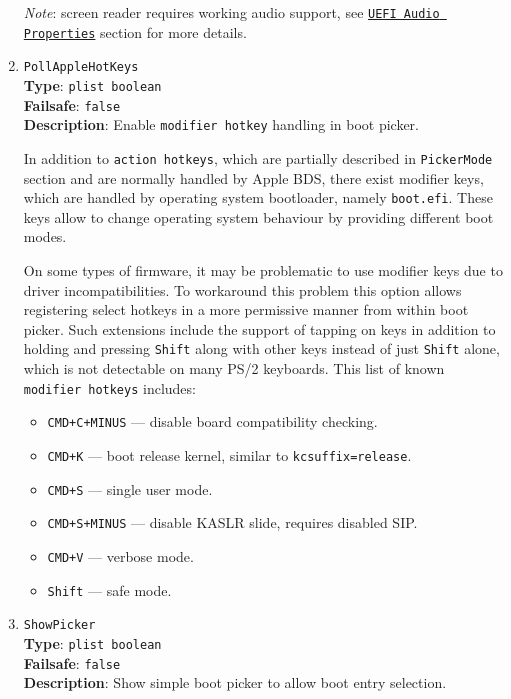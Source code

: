 \documentclass[]{article}
\providecommand{\tightlist}{%
  \setlength{\itemsep}{0pt}\setlength{\parskip}{0pt}}
\begin{document}
\begin{enumerate}
  \emph{Note}: screen reader requires working audio support, see
  \hyperref[uefiaudioprops]{\texttt{UEFI Audio Properties}}
  section for more details.

\item
  \texttt{PollAppleHotKeys}\\
  \textbf{Type}: \texttt{plist\ boolean}\\
  \textbf{Failsafe}: \texttt{false}\\
  \textbf{Description}: Enable \texttt{modifier hotkey} handling in boot picker.

  In addition to \texttt{action hotkeys}, which are partially described in \texttt{PickerMode}
  section and are normally handled by Apple BDS, there exist modifier keys, which are
  handled by operating system bootloader, namely \texttt{boot.efi}. These keys
  allow to change operating system behaviour by providing different boot modes.

  On some types of firmware, it may be problematic to use modifier keys due to driver
  incompatibilities. To workaround this problem this option allows registering select hotkeys
  in a more permissive manner from within boot picker. Such extensions include the support
  of tapping on keys in addition to holding and pressing \texttt{Shift} along with
  other keys instead of just \texttt{Shift} alone, which is not detectable on many
  PS/2 keyboards. This list of known \texttt{modifier hotkeys} includes:
  \begin{itemize}
  \tightlist
  \item \texttt{CMD+C+MINUS} --- disable board compatibility checking.
  \item \texttt{CMD+K} --- boot release kernel, similar to \texttt{kcsuffix=release}.
  \item \texttt{CMD+S} --- single user mode.
  \item \texttt{CMD+S+MINUS} --- disable KASLR slide, requires disabled SIP.
  \item \texttt{CMD+V} --- verbose mode.
  \item \texttt{Shift} --- safe mode.
  \end{itemize}

\item
  \texttt{ShowPicker}\\
  \textbf{Type}: \texttt{plist\ boolean}\\
  \textbf{Failsafe}: \texttt{false}\\
  \textbf{Description}: Show simple boot picker to allow boot entry selection.


\end{enumerate}
\end{document}
